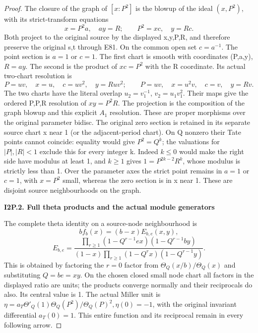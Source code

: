 \begin{proof}
The closure of the graph of \([x:P^{2}]\) is the blowup of the ideal
\((x,P^{2})\), with its strict-transform equations
\[
 x=P^2 a,\quad ay=R;\qquad
 P^2=x c,\quad y=Rc.                                    \tag{I2P.1}
\]
Both project to the original source by the displayed x,y,P,R, and
therefore preserve the original s,t through E81. On the common open
set \(c=a^{-1}\). The point section is \(a=1\) or \(c=1\). The first chart is
smooth with coordinates (P,a,y), \(R=ay\). The second is the product
of \(xc=P^{2}\) with the R coordinate. Its actual two-chart resolution is
\[
 P=uv,\quad x=u,\quad c=uv^2,\quad y=Ruv^2;
 \qquad
 P=uv,\quad x=u^2v,\quad c=v,\quad y=Rv.                 \tag{I2P.2}
\]
The two charts have the literal overlap \(u_2=v_1^{-1}\),
\(v_2=u_1v_1^{2}\). Their maps give the ordered P,P,R resolution of
\(xy=P^{2}R\). The projection is the composition of the graph blowup and
this explicit \(A_{1}\) resolution. These are proper morphisms over the
original parameter bidisc. The original zero section is retained
in its separate source chart x near 1 (or the adjacent-period chart).
On Q nonzero their Tate points cannot coincide: equality would give
\(P^{2}=Q^k\); the valuations for \(|P|,|R|<1\) exclude
this for every integer k. Indeed \(k\le 0\) would make the right side
have modulus at least 1, and \(k\ge 1\) gives \(1=P^{2k-2}R^k\), whose modulus
is strictly less than 1. Over the parameter axes the strict point
remains in \(a=1\) or \(c=1\), with \(x=P^{2}\) small, whereas the zero section is
in x near 1. These are disjoint source neighbourhoods on the graph.

\par

\medskip\noindent\textbf{I2P.2. Full theta products and the actual module generators}

\par\nobreak

The complete theta identity on a source-node neighbourhood is
\[
 b f_b(x)=(b-x)E_{b,e}(x,y),
\]
\[
 E_{b,e}=
 \frac{\prod_{r\ge1}(1-Q^{r-1}ex)(1-Q^{r-1}by)}
 {(1-x)\prod_{r\ge1}(1-Q^r x)(1-Q^{r-1}y)}.              \tag{I2P.3}
\]
This is obtained by factoring the \(r=0\) factor from
\(\Theta_Q(x/b)/\Theta_Q(x)\) and substituting \(Q=be=xy\). On the
chosen closed small node chart all factors in the displayed ratio
are units; the products converge normally and their reciprocals do
also. Its central value is 1. The actual Miller unit is
\(\eta=a_T \Theta'_Q(1) \Theta_Q(P^{2})/\Theta_Q(P)^{2}, \eta(0)=-1\),
with the original invariant differential \(a_T(0)=1\). This entire
function and its reciprocal remain in every following arrow.


\end{proof}
